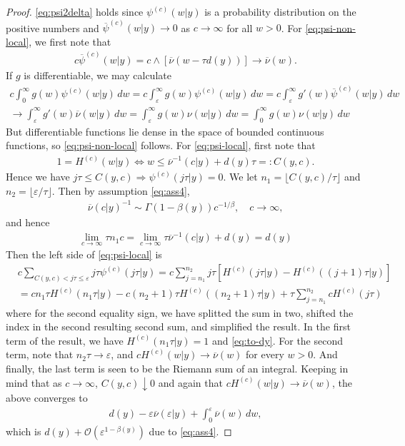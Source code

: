 \documentclass[a4paper,12pt]{elsarticle}
\numberwithin{equation}{section}
\theoremstyle{plain}
\theoremstyle{definition}
\theoremstyle{remark}
\numberwithin{equation}{section}
\newcommand{\1}{\mathbf 1}
\begin{document}
\begin{proof}
\eqref{eq:psi2delta} holds since $\psi^{(c)}(w|y)$ is a probability distribution on the positive numbers and $\overline \psi^{(c)}(w|y) \to 0$ as $c \to \infty$ for all $w > 0$. 
For \eqref{eq:psi-non-local}, we first note that
\begin{align*}
c \overline \psi^{(c)}(w|y)
= c \wedge [\overline \nu(w - \tau d(y))] \to \overline \nu(w).
\end{align*}
If $g$ is differentiable, we may calculate
\begin{align*}
c \int_0^\infty g(w) \psi^{(c)}(w|y)\,dw
= c \int_\varepsilon^\infty g(w) \psi^{(c)}(w|y)\,dw
= c \int_\varepsilon^\infty g'(w) \overline \psi^{(c)}(w|y)\,dw
\\
\to \int_\varepsilon^\infty g'(w) \overline \nu(w|y)\,dw
= \int_\varepsilon^\infty g(w) \nu(w|y)\,dw
= \int_0^\infty g(w) \nu(w|y)\,dw
\end{align*}
But differentiable functions lie dense in the space of bounded continuous functions, so \eqref{eq:psi-non-local} follows.
For \eqref{eq:psi-local}, 
first note that 
\begin{align*}
1 = H^{(c)}(w|y)
\Longleftrightarrow
w \le \overline \nu^{-1}(c|y) + d(y)\tau =: C(y,c).
\end{align*}
Hence we have $j\tau \le C(y,c) \Longrightarrow \psi^{(c)}(j\tau|y) = 0$. 
We let $n_1 = \lfloor C(y,c) / \tau \rfloor$ and 
$n_2 = \lfloor \varepsilon / \tau \rfloor$. 
Then by assumption \eqref{eq:ass4}, 
\begin{align}
\overline \nu(c|y)^{-1} \sim \Gamma(1-\beta(y)) c^{-1/\beta}, 
\quad c \to \infty,
\end{align}
and hence 
\begin{align} \label{eq:to-dy}
\lim_{c \to \infty} \tau n_1 c = \lim_{c \to \infty} \tau \overline \nu^{-1}(c | y) + d(y) = d(y)
\end{align}
Then the left side of \eqref{eq:psi-local} is
\begin{align*}
&c \sum_{C(y,c) < j\tau \le \varepsilon} j\tau \psi^{(c)}(j\tau | y)
= c \sum_{j=n_1}^{n_2} j\tau \left[ H^{(c)}(j\tau | y) - H^{(c)}((j+1)\tau | y)\right]
\\
&= c n_1 \tau H^{(c)}(n_1 \tau | y) - c (n_2+1) \tau H^{(c)}((n_2+1) \tau | y)
+ \tau \sum_{j=n_1}^{n_2} cH^{(c)}(j\tau)
\end{align*}
where for the second equality sign, we have splitted the sum in two, shifted the index in the second resulting second sum, and simplified the result.
In the first term of the result, we have $H^{(c)}(n_1 \tau | y) = 1$ and \eqref{eq:to-dy}.  For the second term, note that $n_2 \tau \to \varepsilon$, and 
$c H^{(c)}(w|y) \to \overline \nu(w)$ for every $w > 0$. 
And finally, the last term is seen to be the Riemann sum of an integral. Keeping in mind that as $c \to \infty$, $C(y,c) \downarrow 0$ and again that $c H^{(c)}(w|y) \to \overline \nu(w)$, the above converges to
\begin{align*}
d(y) - \varepsilon \overline \nu(\varepsilon | y) 
+ \int_0^\varepsilon \overline \nu(w)\,dw,
\end{align*}
which is $d(y) + \mathcal O(\varepsilon^{1-\beta(y)})$ due to \eqref{eq:ass4}.
\end{proof}
\end{document}
